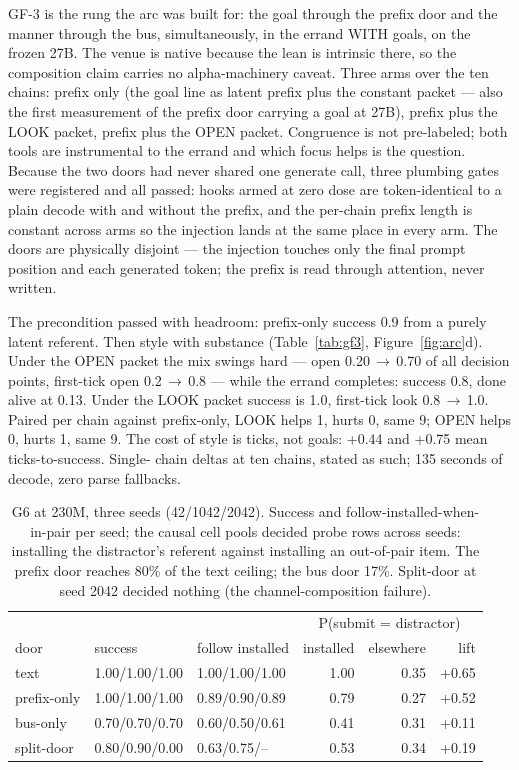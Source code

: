 \documentclass[11pt]{article}
\begin{document}
GF-3 is the rung the arc was built for: the goal through the prefix
door and the manner through the bus, simultaneously, in the errand
WITH goals, on the frozen 27B. The venue is native because the lean is
intrinsic there, so the composition claim carries no alpha-machinery
caveat. Three arms over the ten chains: prefix only (the goal line as
latent prefix plus the constant packet --- also the first measurement
of the prefix door carrying a goal at 27B), prefix plus the LOOK
packet, prefix plus the OPEN packet. Congruence is not pre-labeled;
both tools are instrumental to the errand and which focus helps is the
question. Because the two doors had never shared one generate call,
three plumbing gates were registered and all passed: hooks armed at
zero dose are token-identical to a plain decode with and without the
prefix, and the per-chain prefix length is constant across arms so the
injection lands at the same place in every arm. The doors are
physically disjoint --- the injection touches only the final prompt
position and each generated token; the prefix is read through
attention, never written.

The precondition passed with headroom: prefix-only success
0.9 from a purely latent referent.
Then style with substance (Table~\ref{tab:gf3},
Figure~\ref{fig:arc}d). Under the OPEN packet the mix swings hard ---
open 0.20\,$\to$\,0.70
of all decision points, first-tick open
0.2\,$\to$\,0.8
--- while the errand completes: success 0.8,
done alive at 0.13. Under the LOOK packet
success is 1.0, first-tick look
0.8\,$\to$\,1.0.
Paired per chain against prefix-only, LOOK helps 1,
hurts 0, same 9; OPEN helps
0, hurts 1, same 9. The
cost of style is ticks, not goals: +0.44
and +0.75 mean ticks-to-success. Single-
chain deltas at ten chains, stated as such; 135 seconds of
decode, zero parse fallbacks.

\begin{table}[t]
\centering
\small
\setlength{\tabcolsep}{4pt}
\begin{tabular}{lllrrr}
\toprule
 & & & \multicolumn{3}{c}{P(submit = distractor)} \\
door & success & follow installed & installed & elsewhere & lift \\
\midrule
text & 1.00/1.00/1.00 & 1.00/1.00/1.00 & 1.00 & 0.35 & +0.65 \\
prefix-only & 1.00/1.00/1.00 & 0.89/0.90/0.89 & 0.79 & 0.27 & +0.52 \\
bus-only & 0.70/0.70/0.70 & 0.60/0.50/0.61 & 0.41 & 0.31 & +0.11 \\
split-door & 0.80/0.90/0.00 & 0.63/0.75/-- & 0.53 & 0.34 & +0.19 \\
\bottomrule
\end{tabular}
\caption{G6 at 230M, three seeds (42/1042/2042). Success and
follow-installed-when-in-pair per seed; the causal cell pools decided
probe rows across seeds: installing the distractor's referent against
installing an out-of-pair item. The prefix door reaches
80\% of the text ceiling; the bus
door 17\%. Split-door at seed 2042
decided nothing (the channel-composition failure).}
\label{tab:doors}
\end{table}
\end{document}
